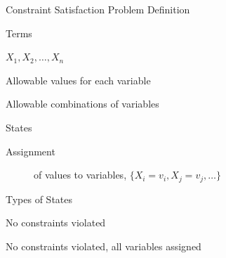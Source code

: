 \documentclass[14pt]{beamer}
\begin{document}
\begin{frame}{Constraint Satisfaction Problem Definition}
	\begin{block}{Terms}
		\begin{description}[Constraints]
			\item[Variables] $X_1, X_2, \ldots, X_n$
			\item[Domains] Allowable values for each variable
			\item[Constraints] Allowable combinations of variables
		\end{description}
	\end{block}
	\begin{block}{States}
		\begin{description}
			\item[Assignment] of values to variables, $\{X_i=v_i, X_j=v_j, \ldots\}$
		\end{description}
	\end{block}
	\begin{block}{Types of States}
		\begin{description}[Consistent]
			\item[Consistent] No constraints violated
			\item[Solution] No constraints violated, all variables assigned
		\end{description}
	\end{block}
\end{frame}
\end{document}
